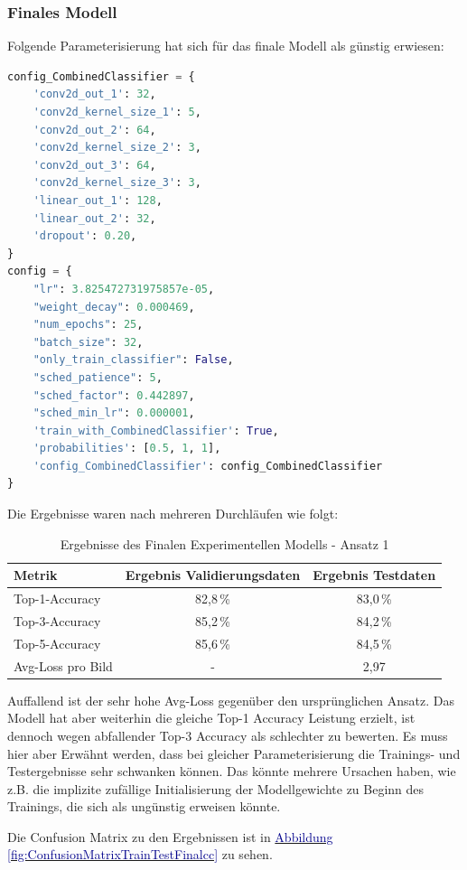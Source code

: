 \documentclass[12pt,oneside]{article}
\begin{document}
			\subsubsection{Finales Modell}
		    	Folgende Parameterisierung hat sich für das finale Modell als günstig erwiesen:
\begin{lstlisting}[language=Python, basicstyle=\small\ttfamily]
config_CombinedClassifier = {
	'conv2d_out_1': 32,
	'conv2d_kernel_size_1': 5,
	'conv2d_out_2': 64,
	'conv2d_kernel_size_2': 3,
	'conv2d_out_3': 64,
	'conv2d_kernel_size_3': 3,
	'linear_out_1': 128,
	'linear_out_2': 32,
	'dropout': 0.20,
}
config = {
	"lr": 3.825472731975857e-05,
	"weight_decay": 0.000469,
	"num_epochs": 25,
	"batch_size": 32,
	"only_train_classifier": False,
	"sched_patience": 5,
	"sched_factor": 0.442897,
	"sched_min_lr": 0.000001,
	'train_with_CombinedClassifier': True,
	'probabilities': [0.5, 1, 1],
	'config_CombinedClassifier': config_CombinedClassifier
}
\end{lstlisting}

Die Ergebnisse waren nach mehreren Durchläufen wie folgt:
  \begin{table}[h!]
	\centering
	\begin{tabular}{|l|c|c|}
		\hline
		\rowcolor{lightgray} \textbf{Metrik} & \textbf{Ergebnis Validierungsdaten} & \textbf{Ergebnis Testdaten} \\ \hline
		Top-1-Accuracy & 82,8\,\% & 83,0\,\% \\ \hline
		Top-3-Accuracy & 85,2\,\% & 84,2\,\% \\ \hline
		Top-5-Accuracy & 85,6\,\% & 84,5\,\% \\ \hline
		Avg-Loss pro Bild & - & 2,97 \\ \hline
	\end{tabular}
	\caption{Ergebnisse des Finalen Experimentellen Modells - Ansatz 1}
\end{table}


	
	Auffallend ist der sehr hohe Avg-Loss gegenüber den ursprünglichen Ansatz. Das Modell hat aber weiterhin die gleiche Top-1 Accuracy Leistung erzielt, ist dennoch wegen abfallender Top-3 Accuracy als schlechter zu bewerten. Es muss hier aber Erwähnt werden, dass bei gleicher Parameterisierung die Trainings- und Testergebnisse sehr schwanken können. Das könnte mehrere Ursachen haben, wie z.B. die implizite zufällige Initialisierung der Modellgewichte zu Beginn des Trainings, die sich als ungünstig erweisen könnte.
	
	Die Confusion Matrix zu den Ergebnissen ist in \hyperref[fig:ConfusionMatrixTrainTestFinalcc]{\textcolor{darkblue}{Abbildung \ref*{fig:ConfusionMatrixTrainTestFinalcc}}} zu sehen. 
\end{document}
